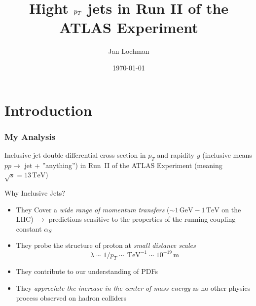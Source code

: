 \documentclass[compress]{beamer}
\title[High $\pt$ jets]{Hight $\pt$ jets in Run II of the ATLAS Experiment}
\author{Jan Lochman}
\institute[FNSPE CTU] 
{
Czech Technical University \\ 
\medskip
\textit{jan.lochman@cern.ch} \\
\medskip
\medskip
ATLAS Meeting \\ 
\medskip
}
\date{\today}
\newcommand{\GeV}{\,\text{GeV}}
\newcommand{\TeV}{\,\text{TeV}}
\newcommand{\pt}{p_{T}}
\begin{document}

\begin{frame}
\titlepage 
\end{frame}


\section{Introduction}

\begin{frame}
\frametitle{My Analysis} 
    Inclusive jet double differential cross section in $\pt$ and rapidity
    $y$ (inclusive means $pp \rightarrow$ jet + ''anything'') in Run~II of the ATLAS
    Experiment (meaning $\sqrt{s}=13\TeV$)

\begin{block}{Why Inclusive Jets?}
  \begin{itemize}
    \item They Cover a \textit{\color{red}wide range of momentum transfers}
      ($\sim 1 \GeV - 1 \TeV$ on the LHC) $\rightarrow$ predictions sensitive to
      the properties of the running coupling constant $\alpha_S$

    \item They probe the structure of proton at \textit{\color{red}small
    distance scales}
    \begin{equation*}
      \lambda \sim 1/\pt \sim \TeV^{-1} \sim 10^{-19}\,\text{m}
    \end{equation*}

    \item They contribute to our understanding of PDFs

    \item They \textit{\color{red}appreciate the increase in the center-of-mass
    energy} as no other physics process observed on hadron colliders
  \end{itemize}
\end{block}

\end{frame}
\end{document}
